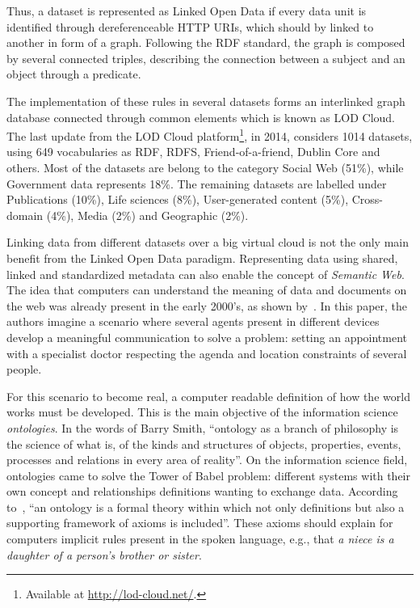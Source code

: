 Thus, a dataset is represented as Linked Open Data if every data unit is identified through dereferenceable HTTP URIs, which should by linked to another in form of a graph.
Following the RDF standard, the graph is composed by several connected triples, describing the connection between a subject and an object through a predicate.

The implementation of these rules in several datasets forms an interlinked graph database connected through common elements which is known as LOD Cloud.
The last update from the LOD Cloud platform\footnote{Available at \url{http://lod-cloud.net/}.}, in 2014, considers 1014 datasets, using 649 vocabularies as RDF, RDFS, Friend-of-a-friend, Dublin Core and others.
Most of the datasets are belong to the category Social Web (51\%), while Government data represents 18\%. The remaining datasets are labelled under Publications (10\%), Life sciences (8\%), User-generated content (5\%), Cross-domain (4\%), Media (2\%) and Geographic (2\%).

Linking data from different datasets over a big virtual cloud is not the only main benefit from the Linked Open Data paradigm.
Representing data using shared, linked and standardized metadata can also enable the concept of \emph{Semantic Web}.
The idea that computers can understand the meaning of data and documents on the web was already present in the early 2000's, as shown by~. In this paper, the authors imagine a scenario where several agents present in different devices develop a meaningful communication to solve a problem: setting an appointment with a specialist doctor respecting the agenda and location constraints of several people.

For this scenario to become real, a computer readable definition of how the world works must be developed.
This is the main objective of the information science \emph{ontologies}.
In the words of Barry Smith, ``ontology as a branch of philosophy is the science of what is, of the kinds and structures of objects, properties, events, processes and relations in every area of reality''\cite{Smith2003}.
On the information science field, ontologies came to solve the Tower of Babel problem: different systems with their own concept and relationships definitions wanting to exchange data.
According to~, ``an ontology is a formal theory within which not only definitions but also a supporting framework of axioms is included''.
These axioms should explain for computers implicit rules present in the spoken language, e.g., that \emph{a niece is a daughter of a person's brother or sister}.

